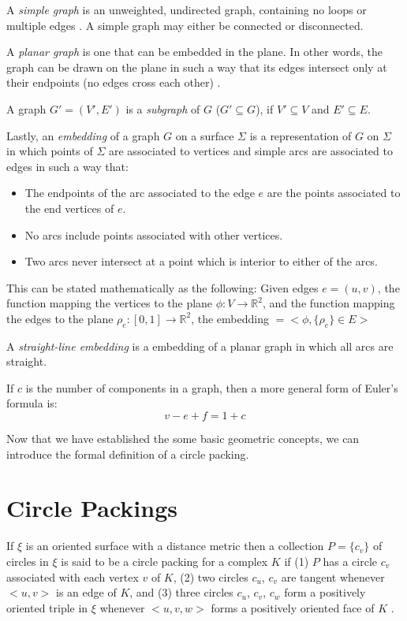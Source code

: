 \documentclass[11pt]{article}
\newcommand{\R}{\mathbb{R}}
\begin{document}
  A \emph{simple graph} is an unweighted, undirected graph, containing no loops or multiple edges \cite{mathworld:SimpleGraphs}. 
  A simple graph may either be connected or disconnected.
  
  A \emph{planar graph} is one that can be embedded in the plane. 
  In other words, the graph can be drawn on the plane in such a way that its edges intersect only at their endpoints (no edges cross each other) \cite{mathworld:PlanarGraph}.
  
  A graph $G' = (V',E')$ is a \emph{subgraph} of $G$ ($G' \subseteq G$), if $V' \subseteq V$ and $E' \subseteq E$.
  
  Lastly, an \emph{embedding} of a graph $G$ on a surface $\Sigma$ is a representation of $G$ on $\Sigma$ in which points of $\Sigma$ are associated to vertices and simple arcs are associated to edges in such a way that:
  \begin{itemize}
	\item The endpoints of the arc associated to the edge $e$ are the points associated to the end vertices of $e$.
	\item No arcs include points associated with other vertices.
	\item Two arcs never intersect at a point which is interior to either of the arcs.
  \end{itemize}
  This can be stated mathematically as the following: Given edges $e=(u,v)$, the function mapping the vertices to the plane $ \phi :V \rightarrow \R^2$, and the function mapping the edges to the plane $ \rho_e :[0,1] \rightarrow \R^2$, the embedding $= <\phi, \{\rho_e\} \in E >$

  A \emph{straight-line embedding} is a embedding of a planar graph in which all arcs are straight.


  If $c$ is the number of components in a graph, then a more general form of Euler's formula is:
  \begin{equation} 
	v-e+f= 1 + c
  \end{equation}

Now that we have established the some basic geometric concepts, we can introduce the formal definition of a circle packing.

\section{Circle Packings}
If $\xi$ is an oriented surface with a distance metric then a collection $P = \{c_v\}$ of circles in $\xi$ is said to be a circle packing for a complex $K$ if (1) $P$ has a circle $c_v$ associated with each vertex $v$ of $K$, (2) two circles $c_u$, $c_v$ are tangent whenever $<u,v>$ is an edge of $K$, and (3) three circles $c_u$, $c_v$, $c_w$ form a positively oriented triple in $\xi$ whenever $<u,v,w>$ forms a positively oriented face of $K$ \cite{stephenson05introduction}. 
\end{document}

